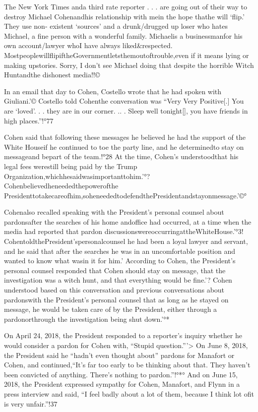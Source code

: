 The New York Times anda third rate reporter . . . are going out of their way to destroy Michael Cohenandhis relationship with mein the hope thathe will ‘flip.’ They use non- existent ‘sources’ and a drunk/drugged up loser who hates Michael, a fine person with a wonderful family. Michaelis a businessmanfor his own account/lawyer whoI have always liked&respected. MostpeoplewillflipiftheGovernmentletsthemoutoftrouble,even if it means lying or making upstories. Sorry, I don’t see Michael doing that despite the horrible Witch Huntandthe dishonest media!!©%

In an email that day to Cohen, Costello wrote that he had spoken with Giuliani.'© Costello told Cohenthe conversation was “Very Very Positive[.] You are ‘loved’. . . they are in our corner. .. . Sleep well tonight[], you have friends in high places.”!°77

Cohen said that following these messages he believed he had the support of the White Houseif he continued to toe the party line, and he determinedto stay on messageand bepart of the team.!°28 At the time, Cohen’s understoodthat his legal fees werestill being paid by the Trump Organization,whichhesaidwasimportanttohim.'°? Cohenbelievedheneededthepowerofthe Presidenttotakecareofhim,soheneededtodefendthePresidentandstayonmessage.'©°

Cohenalso recalled speaking with the President’s personal counsel about pardonsafter the searches of his home andoffice had occurred, at a time when the media had reported that pardon discussionswereoccurringattheWhiteHouse.'°3! CohentoldthePresident’spersonalcounsel he had been a loyal lawyer and servant, and he said that after the searches he was in an uncomfortable position and wanted to know what wasin it for him.'%
According to Cohen, the President’s personal counsel responded that Cohen should stay on message, that the investigation was a witch hunt, and that everything would be fine.'? Cohen understood based on this conversation and previous conversations about pardonswith the President’s personal counsel that as long as he stayed on message, he would be taken care of by the President, either through a pardonorthrough the investigation being shut down.'°*

On April 24, 2018, the President responded to a reporter’s inquiry whether he would consider a pardon for Cohen with, “Stupid question.”'> On June 8, 2018, the President said he “hadn’t even thought about” pardons for Manafort or Cohen, and continued,“It’s far too early to be thinking about that. They haven’t been convicted of anything. There’s nothing to pardon.”!°*° And on June 15, 2018, the President expressed sympathy for Cohen, Manafort, and Flynn in a press interview and said, “I feel badly about a lot of them, because I think lot ofit is very unfair.”!37

